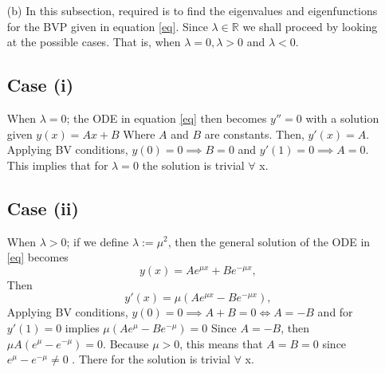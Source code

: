 \documentclass[12pt,a4paper]{article}
\newcommand{\R}{\mathbb{R}}
\begin{document}
\begin{enumerate}
\begin{enumerate}
\item[(b)] 
In this subsection, required is to find the eigenvalues and eigenfunctions for the BVP given in equation \ref{eq}. Since $\lambda \in \R $ we shall proceed by looking at the possible cases. That is, when $\lambda =0, \lambda > 0$ and $\lambda < 0$.
\subsection*{Case (i)}
When $\lambda = 0 $; the ODE in equation \ref{eq} then becomes $y'' = 0$ with a solution given $ y(x)= Ax+B$ Where $A$ and $B$ are constants. Then, $y'(x)= A$. Applying BV conditions, $y(0)=0 \implies B=0$ and $y'(1)=0 \implies A=0$. This implies that for $\lambda = 0$ the solution is trivial $\forall$ x.
\subsection*{Case (ii)}
When $\lambda > 0$; if we define $\lambda := \mu ^2 $, then the general solution of the ODE in \ref{eq} becomes $$y(x) = Ae^{\mu x} + Be^{-\mu x},$$
Then $$ y'(x) = \mu (Ae^{\mu x} -  Be^{-\mu x}),$$
Applying BV conditions, $y(0) =0 \implies A+B = 0 \iff A= -B$ and for $y'(1)=0$ implies $ \mu (Ae^{\mu } -  Be^{-\mu }) = 0$
Since $A= -B$, then $\mu A(e^{\mu } - e^{-\mu }) = 0$. Because $\mu >0$, this means that $A = B = 0$ since $e^{\mu } - e^{-\mu } \ne 0 $ . There for the solution is trivial $\forall$ x.

\end{enumerate}
\end{enumerate}
\end{document}
